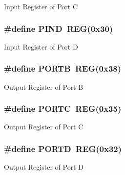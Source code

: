 Input Register of Port C \hypertarget{group__PORTS_ga50997bc44119b844ceaab463c564bfb7}{
\subsubsection[{P\+I\+N\+D}]{\setlength{\rightskip}{0pt plus 5cm}\#define P\+I\+N\+D~{\bf R\+E\+G}(0x30)}}\label{group__PORTS_ga50997bc44119b844ceaab463c564bfb7}
Input Register of Port D \hypertarget{group__PORTS_ga09a0c85cd3da09d9cdf63a5ac4c39f77}{
\subsubsection[{P\+O\+R\+T\+B}]{\setlength{\rightskip}{0pt plus 5cm}\#define P\+O\+R\+T\+B~{\bf R\+E\+G}(0x38)}}\label{group__PORTS_ga09a0c85cd3da09d9cdf63a5ac4c39f77}
Output Register of Port B \hypertarget{group__PORTS_ga68fea88642279a70246e026e7221b0a5}{
\subsubsection[{P\+O\+R\+T\+C}]{\setlength{\rightskip}{0pt plus 5cm}\#define P\+O\+R\+T\+C~{\bf R\+E\+G}(0x35)}}\label{group__PORTS_ga68fea88642279a70246e026e7221b0a5}
Output Register of Port C \hypertarget{group__PORTS_ga3e6a2517db4f9cb7c9037adf0aefe79b}{
\subsubsection[{P\+O\+R\+T\+D}]{\setlength{\rightskip}{0pt plus 5cm}\#define P\+O\+R\+T\+D~{\bf R\+E\+G}(0x32)}}\label{group__PORTS_ga3e6a2517db4f9cb7c9037adf0aefe79b}
Output Register of Port D 